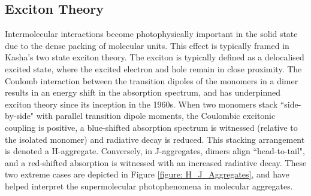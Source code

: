 \subsection{Exciton Theory}\label{section: lom intermolecular-interactions}
Intermolecular interactions become photophysically important in the solid state due to the dense packing of molecular units. This effect is typically framed in Kasha's two state exciton theory.\cite{Gierschner2009,Gierschner2013,Gierschner2013a,Hestand2017,Shi2017} The exciton is typically defined as a delocalised excited state, where the excited electron and hole remain in close proximity. The Coulomb interaction between the transition dipoles of the monomers in a dimer results in an energy shift in the absorption spectrum, and has underpinned exciton theory since its inception in the 1960s.\cite{Kasha1965a} When two monomers stack ``side-by-side" with parallel transition dipole moments, the Coulombic excitonic coupling is positive, a blue-shifted absorption spectrum is witnessed (relative to the isolated monomer) and radiative decay is reduced. This stacking arrangement is denoted a H-aggregate. Conversely, in J-aggregates, dimers align ``head-to-tail", and a red-shifted absorption is witnessed with an increased radiative decay. These two extreme cases are depicted in Figure \ref{figure: H_J_Aggregates}, and have helped interpret the supermolecular photophenomena in molecular aggregates.

